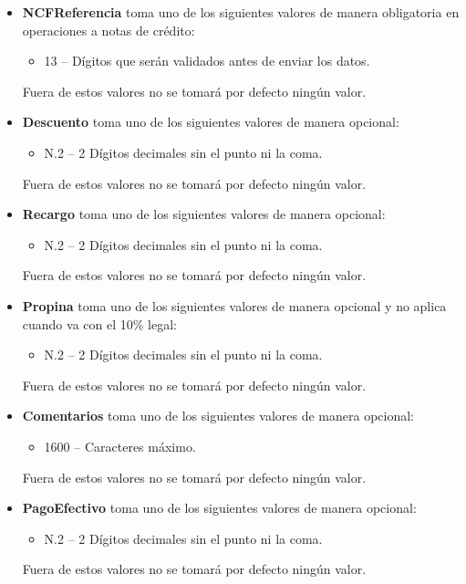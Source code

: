 \documentclass{article}
\begin{document}
\begin{itemize}
    \item \textbf{NCFReferencia} toma uno de los siguientes valores de manera obligatoria en operaciones a notas de crédito:
    \begin{itemize}
        \item 13 – Dígitos que serán validados antes de enviar los datos.
    \end{itemize}
    Fuera de estos valores no se tomará por defecto ningún valor.

    \item \textbf{Descuento} toma uno de los siguientes valores de manera opcional:
    \begin{itemize}
        \item N.2 – 2 Dígitos decimales sin el punto ni la coma.
    \end{itemize}
    Fuera de estos valores no se tomará por defecto ningún valor.

    \item \textbf{Recargo} toma uno de los siguientes valores de manera opcional:
    \begin{itemize}
        \item N.2 – 2 Dígitos decimales sin el punto ni la coma.
    \end{itemize}
    Fuera de estos valores no se tomará por defecto ningún valor.

    \item \textbf{Propina} toma uno de los siguientes valores de manera opcional y no aplica cuando va con el 10\% legal:
    \begin{itemize}
        \item N.2 – 2 Dígitos decimales sin el punto ni la coma.
    \end{itemize}
    Fuera de estos valores no se tomará por defecto ningún valor.

    \item \textbf{Comentarios} toma uno de los siguientes valores de manera opcional:
    \begin{itemize}
        \item 1600 – Caracteres máximo.
    \end{itemize}
    Fuera de estos valores no se tomará por defecto ningún valor.

    \item \textbf{PagoEfectivo} toma uno de los siguientes valores de manera opcional:
    \begin{itemize}
        \item N.2 – 2 Dígitos decimales sin el punto ni la coma.
    \end{itemize}
    Fuera de estos valores no se tomará por defecto ningún valor.


\end{itemize}
\end{document}
